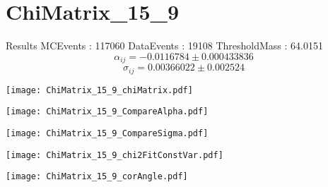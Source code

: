 \documentclass[a4paper,12pt]{article}
\begin{document}
\section{ChiMatrix\_15\_9}
\begin{minipage}{0.49\linewidth} Results \newline
MCEvents : 117060\newline
DataEvents : 19108 \newline
ThresholdMass : 64.0151\\
$$\alpha_{ij} = -0.0116784\pm 0.000433836$$
$$\sigma_{ij} = 0.00366022\pm 0.002524$$
\end{minipage}\hfill
\begin{minipage}{0.49\linewidth} 
\texttt{[image: ChiMatrix\_15\_9\_chiMatrix.pdf]}\\
\end{minipage}
\hfill
\begin{minipage}{0.49\linewidth} 
\texttt{[image: ChiMatrix\_15\_9\_CompareAlpha.pdf]}\\
\end{minipage}
\hfill
\begin{minipage}{0.49\linewidth} 
\texttt{[image: ChiMatrix\_15\_9\_CompareSigma.pdf]}\\
\end{minipage}
\begin{minipage}{0.49\linewidth} 
\texttt{[image: ChiMatrix\_15\_9\_chi2FitConstVar.pdf]}\\
\end{minipage}
\hfill
\begin{minipage}{0.49\linewidth} 
\texttt{[image: ChiMatrix\_15\_9\_corAngle.pdf]}\\
\end{minipage}
\end{document}
